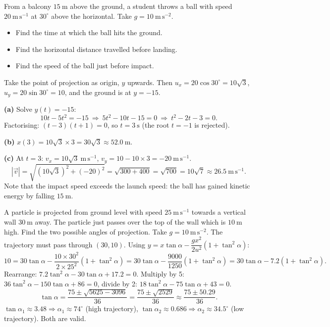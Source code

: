 \documentclass[11pt]{article}
\begin{document}
\begin{exoresolu}
From a balcony $15\ \mathrm{m}$ above the ground, a student throws a ball with speed $20\ \mathrm{m\,s^{-1}}$ at $30^{\circ}$ above the horizontal. Take $g=10\ \mathrm{m\,s^{-2}}$.
\begin{itemize}
\item[(a)] Find the time at which the ball hits the ground.
\item[(b)] Find the horizontal distance travelled before landing.
\item[(c)] Find the speed of the ball just before impact.
\end{itemize}
\tcblower
Take the point of projection as origin, $y$ upwards. Then $u_x=20\cos30^{\circ}=10\sqrt3$, $u_y=20\sin30^{\circ}=10$, and the ground is at $y=-15$.

\textbf{(a)} Solve $y(t)=-15$:
\[
10t-5t^2=-15\ \Longrightarrow\ 5t^2-10t-15=0\ \Longrightarrow\ t^2-2t-3=0.
\]
Factorising: $(t-3)(t+1)=0$, so $t=3\ \mathrm{s}$ (the root $t=-1$ is rejected).

\textbf{(b)} $x(3)=10\sqrt3\times3=30\sqrt3\approx 52.0\ \mathrm{m}$.

\textbf{(c)} At $t=3$: $v_x=10\sqrt3\ \mathrm{m\,s^{-1}}$, $v_y=10-10\times3=-20\ \mathrm{m\,s^{-1}}$.
\[
|\vec{v}|=\sqrt{(10\sqrt3)^2+(-20)^2}=\sqrt{300+400}=\sqrt{700}=10\sqrt7\approx 26.5\ \mathrm{m\,s^{-1}}.
\]
Note that the impact speed exceeds the launch speed: the ball has gained kinetic energy by falling $15\ \mathrm{m}$.
\end{exoresolu}

\begin{exoresolu}
A particle is projected from ground level with speed $25\ \mathrm{m\,s^{-1}}$ towards a vertical wall $30\ \mathrm{m}$ away. The particle just passes over the top of the wall which is $10\ \mathrm{m}$ high. Find the two possible angles of projection. Take $g=10\ \mathrm{m\,s^{-2}}$.
\tcblower
The trajectory must pass through $(30,10)$. Using $y=x\tan\alpha-\dfrac{gx^2}{2u^2}(1+\tan^2\alpha)$:
\[
10=30\tan\alpha-\frac{10\times30^2}{2\times25^2}(1+\tan^2\alpha)=30\tan\alpha-\frac{9000}{1250}(1+\tan^2\alpha)=30\tan\alpha-7.2(1+\tan^2\alpha).
\]
Rearrange: $7.2\tan^2\alpha-30\tan\alpha+17.2=0$. Multiply by 5: $36\tan^2\alpha-150\tan\alpha+86=0$, divide by 2: $18\tan^2\alpha-75\tan\alpha+43=0$.
\[
\tan\alpha=\frac{75\pm\sqrt{5625-3096}}{36}=\frac{75\pm\sqrt{2529}}{36}\approx\frac{75\pm50.29}{36}.
\]
$\tan\alpha_1\approx 3.48 \Rightarrow \alpha_1\approx 74^{\circ}$ (high trajectory), $\tan\alpha_2\approx 0.686 \Rightarrow \alpha_2\approx 34.5^{\circ}$ (low trajectory). Both are valid.
\end{exoresolu}
\end{document}
